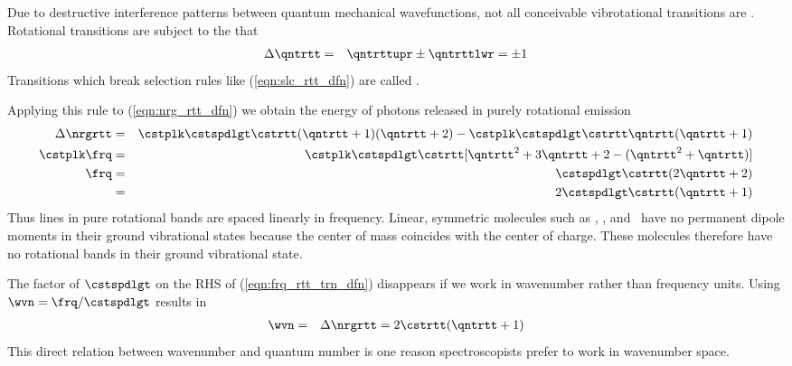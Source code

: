 \documentclass[12pt]{article}
\begin{document}
Due to destructive interference patterns between quantum mechanical
wavefunctions, not all conceivable vibrotational transitions are 
.
Rotational transitions are subject to the 
that 
\begin{eqnarray}
\Delta \qntrtt & = & \qntrttupr \pm \qntrttlwr = \pm 1
\label{eqn:slc_rtt_dfn}
\end{eqnarray}
Transitions which break selection rules like (\ref{eqn:slc_rtt_dfn})
are called .

Applying this rule to (\ref{eqn:nrg_rtt_dfn}) we obtain the energy of
photons released in purely rotational emission
\begin{eqnarray}
\Delta \nrgrtt 
& = & 
\cstplk \cstspdlgt \cstrtt (\qntrtt + 1) (\qntrtt + 2)
- \cstplk \cstspdlgt \cstrtt \qntrtt (\qntrtt + 1) \nonumber \\
\cstplk \frq
& = & \cstplk \cstspdlgt \cstrtt [ \qntrtt^{2} + 3\qntrtt + 2
- ( \qntrtt^{2} + \qntrtt ) ] \nonumber \\
\frq
& = & \cstspdlgt \cstrtt ( 2 \qntrtt + 2 ) \nonumber \\
& = & 2 \cstspdlgt \cstrtt ( \qntrtt + 1 )
\label{eqn:frq_rtt_trn_dfn}
\end{eqnarray}
Thus lines in pure rotational bands are spaced linearly in frequency. 
Linear, symmetric molecules such as \Nd, \Od, and \COd\ have no
permanent dipole moments in their ground vibrational states because
the center of mass coincides with the center of charge.
These molecules therefore have no rotational bands in their ground
vibrational state.

The factor of $\cstspdlgt$ on the RHS of (\ref{eqn:frq_rtt_trn_dfn}) 
disappears if we work in wavenumber rather than frequency units.
Using $\wvn = \frq / \cstspdlgt$ results in 
\begin{eqnarray}
\wvn & = & \Delta \nrgrtt = 2 \cstrtt ( \qntrtt + 1 )
\label{eqn:wvn_rtt_trn_dfn}
\end{eqnarray}
This direct relation between wavenumber and quantum number is one
reason spectroscopists prefer to work in wavenumber space.
\end{document}
